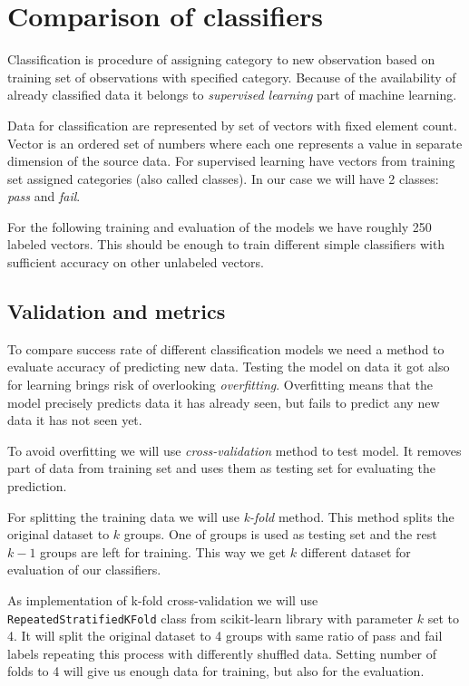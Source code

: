 \section{Comparison of classifiers} \label{sec:classifier_comparison}
Classification is procedure of assigning category to new observation based on
training set of observations with specified category. Because of the
availability of already classified data it belongs to \emph{supervised learning}
part of machine learning.

Data for classification are represented by set of vectors with fixed element
count. Vector is an ordered set of numbers where each one represents a value in
separate dimension of the source data. For supervised learning have vectors from
training set assigned categories (also called classes). In our case we will have
2 classes: \emph{pass} and \emph{fail}.

For the following training and evaluation of the models we have roughly 250
labeled vectors. This should be enough to train different simple classifiers with
sufficient accuracy on other unlabeled vectors.

\subsection{Validation and metrics} \label{subsec:validation}
To compare success rate of different classification models we need a method to evaluate
accuracy of predicting new data. Testing the model on data it got also for
learning brings risk of overlooking \emph{overfitting}. Overfitting means that the model
precisely predicts data it has already seen, but fails to predict any new data
it has not seen yet.

To avoid overfitting we will use \emph{cross-validation} method to test model.
It removes part of data from training set and uses them as testing set for
evaluating the prediction.

For splitting the training data we will use \emph{k-fold} method. This method
splits the original dataset to $k$ groups. One of groups is used as testing set and
the rest $k - 1$ groups are left for training. This way we get $k$ different
dataset for evaluation of our classifiers.

As implementation of k-fold cross-validation we will use
\texttt{Repeated\-Stratified\-K\-Fold} class from scikit-learn library with parameter
$k$ set to 4. It will split the original dataset to 4 groups with same ratio of
pass and fail labels repeating this process with differently shuffled data.
Setting number of folds to 4 will give us enough data for training, but also for
the evaluation.

